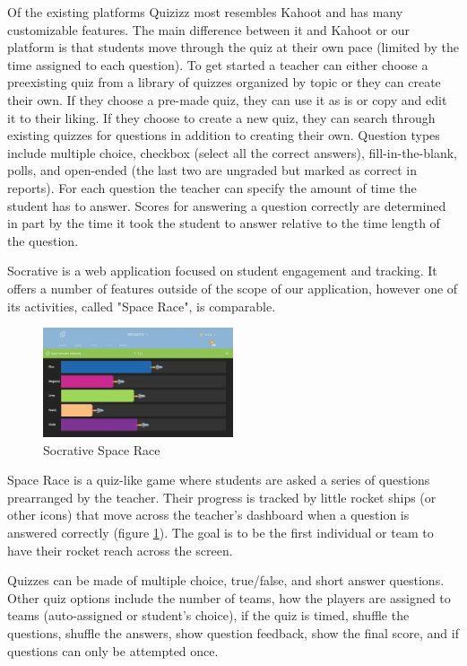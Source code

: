 \documentclass{article}
\begin{document}
Of the existing platforms Quizizz most resembles Kahoot and has many customizable features. The main difference between it and Kahoot or our platform is that students move through the quiz at their own pace (limited by the time assigned to each question). To get started a teacher can either choose a preexisting quiz from a library of quizzes organized by topic or they can create their own. If they choose a pre-made quiz, they can use it as is or copy and edit it to their liking. If they choose to create a new quiz, they can search through existing quizzes for questions in addition to creating their own. Question types include multiple choice, checkbox (select all the correct answers), fill-in-the-blank, polls, and open-ended (the last two are ungraded but marked as correct in reports). For each question the teacher can specify the amount of time the student has to answer. Scores for answering a question correctly are determined in part by the time it took the student to answer relative to the time length of the question.  

Socrative is a web application focused on student engagement and tracking. It offers a number of features outside of the scope of our application, however one of its activities, called "Space Race", is comparable.
\begin{figure}
    \centering
    \includegraphics[width=0.5\textwidth]{socrative-space_race}
    \caption{Socrative Space Race \cite{socrative}}
    \label{fig:socrative-space-race}
\end{figure}
Space Race is a quiz-like game where students are asked a series of questions prearranged by the teacher. Their progress is tracked by little rocket ships (or other icons) that move across the teacher's dashboard when a question is answered correctly (figure \ref{fig:socrative-space-race}). The goal is to be the first individual or team to have their rocket reach across the screen.

Quizzes can be made of multiple choice, true/false, and short answer questions. Other quiz options include the number of teams, how the players are assigned to teams (auto-assigned or student's choice), if the quiz is timed, shuffle the questions, shuffle the answers, show question feedback, show the final score, and if questions can only be attempted once.
\end{document}
